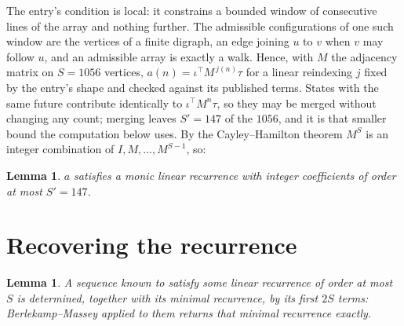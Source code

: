 \documentclass[11pt,a4paper]{article}
\theoremstyle{plain}
\newtheorem{lemma}[theorem]{Lemma}
\theoremstyle{definition}
\begin{document}
The entry's condition is local: it constrains a bounded window of consecutive lines of the
array and nothing further. The admissible configurations of one such window are the vertices
of a finite digraph, an edge joining $u$ to $v$ when $v$ may follow $u$, and an admissible
array is exactly a walk. Hence, with $M$ the adjacency matrix on $S=1056$ vertices,
$a(n)=\iota^{\!\top}M^{\,j(n)}\tau$ for a linear reindexing $j$ fixed by the entry's shape
and checked against its published terms. States with the same future contribute identically to $\iota^{\!\top}M^n\tau$, so they may be merged without changing any count; merging leaves $S'=147$ of the $1056$, and it is that smaller bound the computation below uses. By the Cayley--Hamilton theorem $M^{S}$ is an
integer combination of $I,M,\dots,M^{S-1}$, so:

\begin{lemma}\label{lem:cf}
$a$ satisfies a monic linear recurrence with integer coefficients of order at most
$S'=147$.
\end{lemma}

\section{Recovering the recurrence}

\begin{lemma}\label{lem:bm}
A sequence known to satisfy some linear recurrence of order at most $S$ is determined, together
with its minimal recurrence, by its first $2S$ terms: Berlekamp--Massey applied to them returns
that minimal recurrence exactly.
\end{lemma}
\end{document}
